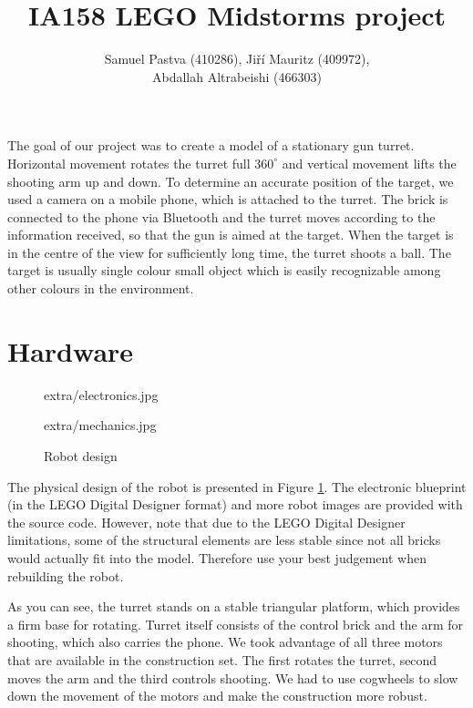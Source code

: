 \documentclass{article}
\title{IA158 LEGO Midstorms project}
\author{Samuel Pastva (410286), Jiří Mauritz (409972), \\ Abdallah Altrabeishi (466303)}
\begin{document}
\maketitle


The goal of our project was to create a model of a stationary gun turret.
Horizontal movement rotates the turret full $360^\circ$ and vertical movement lifts the shooting arm up and down.
To determine an accurate position of the target, we used a camera on a mobile phone, which is attached to the turret.
The brick is connected to the phone via Bluetooth and the turret moves according to the information received, so that the gun is aimed at the target.
When the target is in the centre of the view for sufficiently long time, the turret shoots a ball.
The target is usually single colour small object which is easily recognizable among other colours in the environment.


\section{Hardware}

\begin{figure}
	
	\begin{center}
		\begin{overpic}[width=.5\textwidth]{extra/electronics.jpg}\end{overpic}\hfill
		\begin{overpic}[width=.5\textwidth]{extra/mechanics.jpg}\end{overpic}\hfill
	\end{center}
	
	\caption{Robot design}
	\label{fig:robot}
\end{figure}

The physical design of the robot is presented in Figure \ref{fig:robot}. The electronic blueprint (in the LEGO Digital Designer format) and more robot images are provided with the source code. However, note that due to the LEGO Digital Designer limitations, some of the structural elements are less stable since not all bricks would actually fit into the model. Therefore use your best judgement when rebuilding the robot.

As you can see, the turret stands on a stable triangular platform, which provides a firm base for rotating. Turret itself consists of the control brick and the arm for shooting, which also carries the phone. We took advantage of all three motors that are available in the construction set. The first rotates the turret, second moves the arm and the third controls shooting. We had to use cogwheels to slow down the movement of the motors and make the construction more robust.
\end{document}
